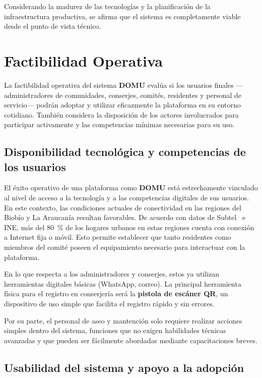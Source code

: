Considerando la madurez de las tecnologías y la planificación de la infraestructura productiva, se afirma que el sistema es completamente viable desde el punto de vista técnico.

\section{Factibilidad Operativa}

La factibilidad operativa del sistema \textbf{DOMU} evalúa si los usuarios finales —administradores de comunidades, conserjes, comités, residentes y personal de servicio— podrán adoptar y utilizar eficazmente la plataforma en su entorno cotidiano. También considera la disposición de los actores involucrados para participar activamente y las competencias mínimas necesarias para su uso.

\subsection{Disponibilidad tecnológica y competencias de los usuarios}

El éxito operativo de una plataforma como \textbf{DOMU} está estrechamente vinculado al nivel de acceso a la tecnología y a las competencias digitales de sus usuarios. En este contexto, las condiciones actuales de conectividad en las regiones del Biobío y La Araucanía resultan favorables. De acuerdo con datos de Subtel~\cite{subtel2025} e INE, más del 80~\% de los hogares urbanos en estas regiones cuenta con conexión a Internet fija o móvil. Esto permite establecer que tanto residentes como miembros del comité poseen el equipamiento necesario para interactuar con la plataforma.

En lo que respecta a los administradores y conserjes, estos ya utilizan herramientas digitales básicas (WhatsApp, correo). La principal herramienta física para el registro en conserjería será la \textbf{pistola de escáner QR}, un dispositivo de uso simple que facilita el registro rápido y sin errores.

Por su parte, el personal de aseo y mantención solo requiere realizar acciones simples dentro del sistema, funciones que no exigen habilidades técnicas avanzadas y que pueden ser fácilmente abordadas mediante capacitaciones breves.

\subsection{Usabilidad del sistema y apoyo a la adopción}

